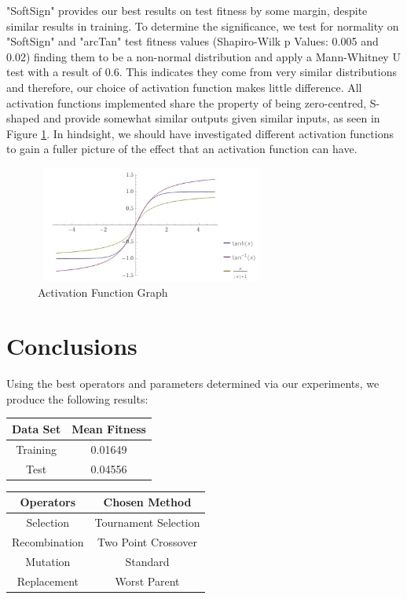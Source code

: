 \documentclass[sigconf]{acmart}
\begin{document}
"SoftSign" provides our best results on test fitness by some margin, despite similar results in training. To determine the significance, we test for normality on "SoftSign" and "arcTan" test fitness values (Shapiro-Wilk p Values: 0.005 and 0.02) finding them to be a non-normal distribution and apply a Mann-Whitney U test with a result of 0.6. This indicates they come from very similar distributions and therefore, our choice of activation function makes little difference. All activation functions implemented share the property of being zero-centred, S-shaped and provide somewhat similar outputs given similar inputs, as seen in Figure \ref{fig:functionGraph}. In hindsight, we should have investigated different activation functions to gain a fuller picture of the effect that an activation function can have.

\begin{figure}[!htb]
\includegraphics[height=1.5in,width=3in]{activationFunction}
\caption{Activation Function Graph}
\label{fig:functionGraph}
\end{figure}


\section{Conclusions}
Using the best operators and parameters determined via our experiments, we produce the following results:
\begin{center}

\begin{tabular} {|c|c|}
\hline
Data Set & Mean Fitness \\
\hline
Training & 0.01649 \\
Test & 0.04556 \\
\hline

\end{tabular}
\end{center}
\vspace{1em}
\begin{center}
\begin{tabular} {|c|c|}
\hline
Operators & Chosen Method \\
\hline
Selection & Tournament Selection \\
Recombination & Two Point Crossover \\
Mutation & Standard \\
Replacement & Worst Parent \\
\hline
\end{tabular}
\end{center}
\end{document}
